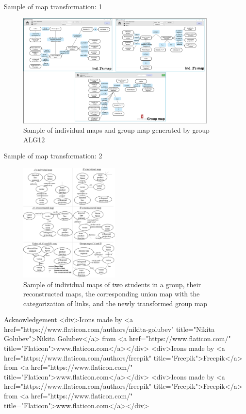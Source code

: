 \begin{frame}{Sample of map transformation: 1}
    \begin{figure}[tb]
    \begin{center}
        \includegraphics[width=100mm]{images/a1_dist_correctness.pdf}
    \end{center}
    \caption{Sample of individual maps and group map generated by group ALG12}
    \label{a1::map_sample}
\end{figure}
\end{frame}

\begin{frame}{Sample of map transformation: 2}
    \begin{figure}[tb]
        \begin{center}
            \includegraphics[width=50mm]{images/a3_sample_of_map.pdf}
        \end{center}
        \caption{Sample of individual maps of two students in a group, their reconstructed maps,
            the corresponding union map with the categorization of links, and the 
            newly transformed group map}
        \label{map_sample}
    \end{figure} 
\end{frame}

\begin{frame}{Acknowledgement}
    <div>Icons made by <a href="https://www.flaticon.com/authors/nikita-golubev" title="Nikita Golubev">Nikita Golubev</a> from <a href="https://www.flaticon.com/" title="Flaticon">www.flaticon.com</a></div>
    <div>Icons made by <a href="https://www.flaticon.com/authors/freepik" title="Freepik">Freepik</a> from <a href="https://www.flaticon.com/" title="Flaticon">www.flaticon.com</a></div>
    <div>Icons made by <a href="https://www.flaticon.com/authors/freepik" title="Freepik">Freepik</a> from <a href="https://www.flaticon.com/" title="Flaticon">www.flaticon.com</a></div>
\end{frame}


